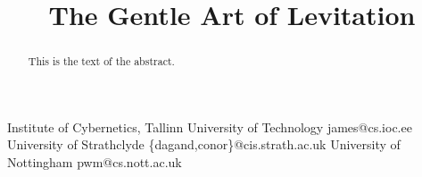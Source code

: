 \documentclass[preprint, authoryear]{sigplanconf}
\begin{document}






\title{The Gentle Art of Levitation}


           {Institute of Cybernetics, Tallinn University of Technology}
           {james@cs.ioc.ee}
           {University of Strathclyde}
           {\{dagand,conor\}@cis.strath.ac.uk}
           {University of Nottingham}
           {pwm@cs.nott.ac.uk}


\maketitle




\begin{abstract}
This is the text of the abstract.
\end{abstract}






\end{document}
